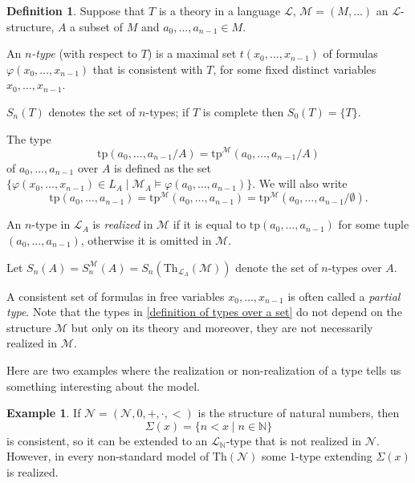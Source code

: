 \documentclass[10pt]{amsart}
\renewcommand{\L}{\mathcal{L}}
\newcommand{\NNN}{\mathbb{N}}
\newcommand{\MM}{\mathcal{M}}
\newcommand{\NN}{\mathcal{N}}
\newcommand{\Th}{\mathrm{Th}}
\newcommand{\tp}{\mathrm{tp}}
\theoremstyle{definition}
\newtheorem{definition}[theorem]{Definition}
\newtheorem{example}[theorem]{Example}
\theoremstyle{remark}
\newenvironment{enumerate-(a)}{\begin{enumerate}[label={\upshape (\alph*)}, leftmargin=2pc]}{\end{enumerate}}
\begin{document}
\begin{definition} 
Suppose that $T$ is a theory in a language $\L$, $\MM=(M,\dots)$ an $\L$-structure, $A$ a subset of $M$ and $a_0,\dots,a_{n-1}\in M$. 
\begin{enumerate-(a)} 
\item 
An \emph{$n$-type} (with respect to $T$) is a maximal set $t(x_0,\dots,x_{n-1})$ of formulas $\varphi(x_0,\dots,x_{n-1})$ that is consistent with $T$, for some fixed distinct variables $x_0,\dots,x_{n-1}$. 
\item
$S_n(T)$ denotes the set of $n$-types; if $T$ is complete then $S_0(T)=\{T\}$. 
\item \label{types over a set}
The type $$\tp(a_0,\dots,a_{n-1}/A)=\tp^\MM(a_0,\dots,a_{n-1}/A)$$ of $a_0,\dots,a_{n-1}$ over $A$ is defined as the set $\{\varphi(x_0,\dots,x_{n-1})\in L_A\mid \MM_A\models \varphi(a_0,\dots,a_{n-1})\}$. 
We will also write $$\tp(a_0,\dots,a_{n-1})=\tp^\MM(a_0,\dots,a_{n-1})=\tp^\MM(a_0,\dots,a_{n-1}/\emptyset).$$ 
\item 
An $n$-type in $\L_A$ is \emph{realized} in $\MM$ if it is equal to $\tp(a_0,\dots,a_{n-1})$ for some tuple $(a_0,\dots,a_{n-1})$, otherwise it is {omitted} in $\MM$. 
\item \label{definition of types over a set} 
Let $S_n(A)=S_n^\MM(A)=S_n(\Th_{\L_A}(\MM))$ denote the set of $n$-types over $A$. 
\end{enumerate-(a)} 
\end{definition} 

A consistent set of formulas in free variables $x_0,\dots,x_{n-1}$ is often called a \emph{partial type}. 
Note that the types in \ref{definition of types over a set} do not depend on the structure $\MM$ but only on its theory and moreover, they are not necessarily realized in $\MM$. 

Here are two examples where the realization or non-realization of a type tells us something interesting about the model. 

\begin{example} 
If $\NN=(\NN,0,+,\cdot,<)$ is the structure of natural numbers, then $$\Sigma(x)=\{n<x\mid n\in \NNN\}$$ is consistent, so it can be extended to an $\L_\NNN$-type that is not realized in $\NN$. However, in every non-standard model of $\Th(\NN)$ some $1$-type extending $\Sigma(x)$ is realized. 
\end{example} 
\end{document}
